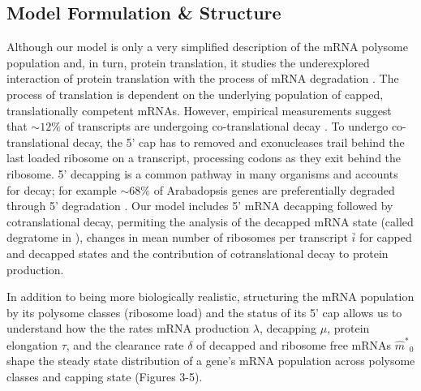 \documentclass[a4,center,fleqn,nocrop]{NAR}
\newcommand{\mhat}{\ensuremath{\hat{m}}\xspace}
\newcommand{\mhatstar}{\ensuremath{\mhat^{*}}\xspace}
\newcommand{\MRL}{\ensuremath{\bar{i}}\xspace}
\begin{document}
\subsection{Model Formulation \& Structure}

Although our model is only a very simplified description of the mRNA polysome population and, in turn, protein translation, it studies the underexplored interaction of protein translation with the process of mRNA degradation \citep{RN11}. The process of translation is dependent on the underlying population of capped, translationally competent mRNAs. However, empirical measurements suggest that $\sim 12\%$ of transcripts are undergoing co-translational decay \citep{RN4}. To undergo co-translational decay, the 5' cap has to removed and exonucleases trail behind the last loaded ribosome on a transcript, processing codons as they exit behind the ribosome. 5' decapping is a common pathway in many organisms and accounts for decay; for example $\sim 68\%$ of Arabadopsis genes are preferentially degraded through 5' degradation \citep{RN28}.
Our model includes 5' mRNA decapping followed by cotranslational decay, permiting the analysis of the decapped mRNA state (called degratome in \citep{RN34}), changes in mean number of ribosomes per transcript \MRL for capped and decapped states and the contribution of cotranslational decay to protein production.

In addition to being more biologically realistic, structuring the mRNA population by its polysome classes (ribosome load) and the status of its 5' cap allows us to understand how the the rates mRNA production $\lambda$, decapping $\mu$, protein elongation $\tau$, and the clearance rate $\delta$ of decapped and ribosome free mRNAs $\mhatstar_0$ shape the steady state distribution of a gene's mRNA population across polysome classes and capping state (Figures 3-5).
\end{document}
